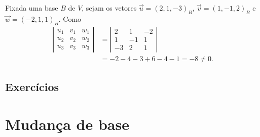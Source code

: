 \begin{ex}
  Fixada uma base $B$ de $V$, sejam os vetores $\vec{u} = (2,1,-3)_B$, $\vec{v} = (1,-1,2)_B$ e $\vec{w} = (-2,1,1)_B$. Como
  \begin{align}
    \left|\begin{array}{ccc}
            u_1 & v_1 & w_1\\
            u_2 & v_2 & w_2\\
            u_3 & v_3 & w_3
          \end{array}\right| &=
                               \left|\begin{array}{ccc}
                                       2 & 1 & -2\\
                                       1 & -1 & 1\\
                                       -3 & 2 & 1
                                     \end{array}\right| \\
    &= -2-4-3+6-4-1 = -8\neq 0.
  \end{align}
\end{ex}

\subsection*{Exercícios}

\emconstrucao

\section{Mudança de base}\label{cap_base_sec_mudbas}

